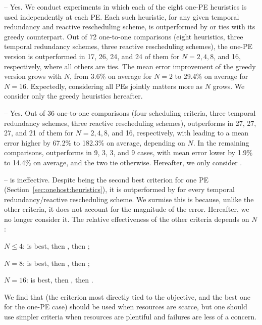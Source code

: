 -- Yes. We conduct
experiments in which each of the eight one-PE heuristics is used
independently at each PE. Each such heuristic, for any given temporal
redundancy and reactive rescheduling scheme, is outperformed by or ties
with its greedy counterpart.  Out of 72 one-to-one comparisons (eight
heuristics, three temporal redundancy schemes, three reactive rescheduling
schemes), the one-PE version is outperformed in 17, 26, 24, and 24 of them
for $N{=}2, 4, 8$, and 16, respectively, where all others are ties.  The
mean error improvement of the greedy version grows with $N$, from 3.6\% on
average for $N{=}2$ to 29.4\% on average for $N{=}16$. Expectedly,
considering all PEs jointly matters more as $N$ grows.  We consider only
the greedy heuristics hereafter.

 --
Yes. Out of 36 one-to-one comparisons (four scheduling criteria, three temporal redundancy schemes, three reactive rescheduling schemes),  \foresighted
outperforms \nearsighted in 27, 27, 27, and 21 of them for $N{=}2, 4,
8$, and 16, respectively, with \nearsighted leading to a mean error higher
by 67.2\% to 182.3\% on average, depending on
$N$.  In the remaining comparisons, \nearsighted outperforms \foresighted in 9, 3, 3, and 9 
cases, with mean error lower by 1.9\% to 14.4\% on average, and the two tie otherwise.  
Hereafter, we only consider \foresighted.

 --
\probsuccess is ineffective. Despite being the second best criterion for one PE
(Section~\ref{sec:onehost:heuristics}), it is outperformed by
\expectederror for every temporal redundancy/reactive rescheduling scheme.
We surmise this is because, unlike the other criteria, it does not account for the magnitude
of the error. Hereafter, we no longer consider it. 
The relative effectiveness of the other criteria depends on $N$:
\begin{compactitem}
	\item $N{\leq}4$: \expectederror is best, then \ratio, then \errorlevel;
	\item $N{=}8$: \ratio is best, then \expectederror, then \errorlevel;
	\item $N{=}16$: \errorlevel is best, then \ratio, then \expectederror.
\end{compactitem}
\noindent
We find that \expectederror (the criterion most directly tied to the
objective, and the best one for the one-PE case) should be used when resources are scarce, 
but one should use simpler criteria when resources are plentiful and failures are
less of a concern. 

